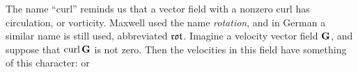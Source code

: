 The name ``curl'' reminds us that a vector field with a nonzero curl
has circulation, or vorticity. Maxwell used the name \emph{rotation}, and
in German a similar name is still used, abbreviated $\frak{rot}$. Imagine
a velocity vector field $\mathbf{G}$, and suppose that $\operatorname{curl}\mathbf{G}$ is not zero. Then
the velocities in this field have something of this character: 
or
